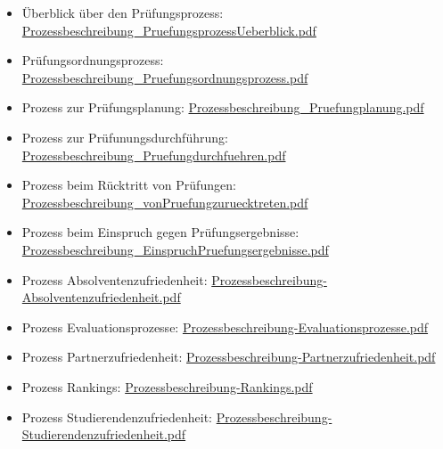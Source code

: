 \begin{itemize}
\tightlist
\item
  Überblick über den Prüfungsprozess:
  \href{https://th-koeln.github.io/mi-2017/anhaenge/Prozessbeschreibung_PruefungsprozessUeberblick.pdf}{Prozessbeschreibung\_PruefungsprozessUeberblick.pdf}
\item
  Prüfungsordnungsprozess:
  \href{https://th-koeln.github.io/mi-2017/anhaenge/Prozessbeschreibung_Pruefungsordnungsprozess.pdf}{Prozessbeschreibung\_Pruefungsordnungsprozess.pdf}
\item
  Prozess zur Prüfungsplanung:
  \href{https://th-koeln.github.io/mi-2017/anhaenge/Prozessbeschreibung_Pruefungplanung.pdf}{Prozessbeschreibung\_Pruefungplanung.pdf}
\item
  Prozess zur Prüfunungsdurchführung:
  \href{https://th-koeln.github.io/mi-2017/anhaenge/Prozessbeschreibung_Pruefungdurchfuehren.pdf}{Prozessbeschreibung\_Pruefungdurchfuehren.pdf}
\item
  Prozess beim Rücktritt von Prüfungen:
  \href{https://th-koeln.github.io/mi-2017/anhaenge/Prozessbeschreibung_vonPruefungzuruecktreten.pdf}{Prozessbeschreibung\_vonPruefungzuruecktreten.pdf}
\item
  Prozess beim Einspruch gegen Prüfungsergebnisse:
  \href{https://th-koeln.github.io/mi-2017/anhaenge/Prozessbeschreibung_EinspruchPruefungsergebnisse.pdf}{Prozessbeschreibung\_EinspruchPruefungsergebnisse.pdf}
\item
  Prozess Absolventenzufriedenheit:
  \href{https://th-koeln.github.io/mi-2017/anhaenge/Prozessbeschreibung-Absolventenzufriedenheit.pdf}{Prozessbeschreibung-Absolventenzufriedenheit.pdf}
\item
  Prozess Evaluationsprozesse:
  \href{https://th-koeln.github.io/mi-2017/anhaenge/Prozessbeschreibung-Evaluationsprozesse.pdf}{Prozessbeschreibung-Evaluationsprozesse.pdf}
\item
  Prozess Partnerzufriedenheit:
  \href{https://th-koeln.github.io/mi-2017/anhaenge/Prozessbeschreibung-Partnerzufriedenheit.pdf}{Prozessbeschreibung-Partnerzufriedenheit.pdf}
\item
  Prozess Rankings:
  \href{https://th-koeln.github.io/mi-2017/anhaenge/Prozessbeschreibung-Rankings.pdf}{Prozessbeschreibung-Rankings.pdf}
\item
  Prozess Studierendenzufriedenheit:
  \href{https://th-koeln.github.io/mi-2017/anhaenge/Prozessbeschreibung-Studierendenzufriedenheit.pdf}{Prozessbeschreibung-Studierendenzufriedenheit.pdf}
\end{itemize}

